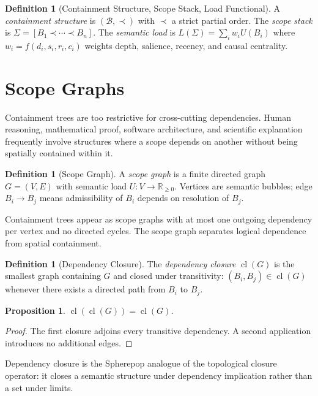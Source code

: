 \documentclass[12pt,oneside]{book}
\theoremstyle{plain}
\newtheorem{proposition}[theorem]{Proposition}
\theoremstyle{definition}
\newtheorem{definition}[theorem]{Definition}
\theoremstyle{remark}
\newcommand{\cl}{\operatorname{cl}}
\newcommand{\Real}{\mathbb{R}}
\begin{document}
\begin{definition}[Containment Structure, Scope Stack, Load Functional]
A \emph{containment structure} is $(\mathcal{B}, \prec)$ with $\prec$ a
strict partial order. The \emph{scope stack} is $\Sigma = [B_1 \prec \cdots
\prec B_n]$. The \emph{semantic load} is
$L(\Sigma) = \sum_i w_i U(B_i)$ where $w_i = f(d_i, s_i, r_i, c_i)$
weights depth, salience, recency, and causal centrality.
\end{definition}

\section{Scope Graphs}

Containment trees are too restrictive for cross-cutting dependencies.
Human reasoning, mathematical proof, software architecture, and scientific
explanation frequently involve structures where a scope depends on another
without being spatially contained within it.

\begin{definition}[Scope Graph]
A \emph{scope graph} is a finite directed graph $G = (V, E)$ with semantic
load $U : V \to \Real_{\geq 0}$. Vertices are semantic bubbles; edge
$B_i \to B_j$ means admissibility of $B_i$ depends on resolution of $B_j$.
\end{definition}

Containment trees appear as scope graphs with at most one outgoing dependency
per vertex and no directed cycles. The scope graph separates logical dependence
from spatial containment.

\begin{definition}[Dependency Closure]
The \emph{dependency closure} $\cl(G)$ is the smallest graph containing $G$
and closed under transitivity: $(B_i, B_j) \in \cl(G)$ whenever there exists
a directed path from $B_i$ to $B_j$.
\end{definition}

\begin{proposition}
$\cl(\cl(G)) = \cl(G)$.
\end{proposition}

\begin{proof}
The first closure adjoins every transitive dependency. A second application
introduces no additional edges.
\end{proof}

Dependency closure is the Spherepop analogue of the topological closure
operator: it closes a semantic structure under dependency implication rather
than a set under limits.
\end{document}
